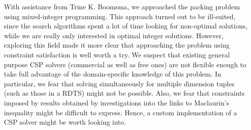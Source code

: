 With assistance from Trine K. Boomsma, we approached the packing problem using mixed-integer programming. This approach turned out to be ill-suited, since the search algorithms spent a lot of time looking for non-optimal solutions, while we are really only interested in optimal integer solutions. However, exploring this field made it more clear that approaching the problem using constraint satisfaction is well worth a try. We suspect that existing general purpose CSP solvers (commercial as well as free ones) are not flexible enough to take full advantage of the domain-specific knowledge of this problem. In particular, we fear that solving simultaneously for multiple dimension tuples (such as those in a RDTS) might not be possible. Also, we fear that constraints imposed by results obtained by investigations into the links to Maclaurin's inequality might be difficult to express. Hence, a custom implementation of a CSP solver might be worth looking into.
